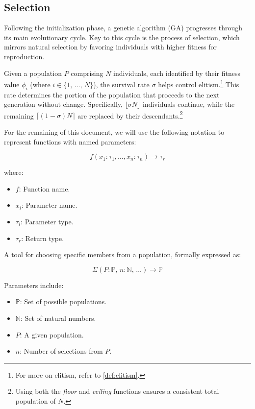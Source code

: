 \subsection{Selection}
\label{sec:bg:ga:select}
  Following the initialization phase, a genetic algorithm (GA) progresses 
  through its main evolutionary cycle.
  Key to this cycle is the process of selection, which mirrors natural selection 
  by favoring individuals with higher fitness for reproduction.

  Given a population \(P\) comprising \(N\) individuals, each identified by 
  their fitness value \(\phi_i\) (where \(i \in \{1,\, \dots,\, N\}\)), the 
  survival rate \(\sigma\) helps control elitism.\footnote{
    For more on elitism, refer to \vref{def:elitism}.
  } This rate determines the portion of the population that proceeds to the next generation without change.
  Specifically, \(\lfloor\sigma N\rfloor\) individuals continue, while the 
  remaining \(\lceil(1 - \sigma)N\rceil\) are replaced by their
  descendants.\footnote{
    Using both the \textit{floor} and \textit{ceiling} functions ensures a 
    consistent total population of \(N\).
  }

  For the remaining of this document, we will use the following notation to represent functions with named parameters:

  \[
    f(x_1: \tau_1, \dots, x_n: \tau_n) \to \tau_r
  \]
  
  where:

  \begin{itemize}
    \item \(f\): Function name.
    \item \(x_i\): Parameter name.
    \item \(\tau_i\): Parameter type.
    \item \(\tau_r\): Return type.
  \end{itemize}
  
  \begin{definition}
  \label{def:selection_operator}
    A tool for choosing specific members from a population, formally expressed as:

    \[
      \Sigma(P: \mathbb{P},\, n: \mathbb{N},\, \dots) \to \mathbb{P}
    \]

    Parameters include:
    
    \begin{itemize}
      \item \(\mathbb{P}\): Set of possible populations.
      \item \(\mathbb{N}\): Set of natural numbers.
      \item \(P\): A given population.
      \item \(n\): Number of selections from \(P\).
    \end{itemize}
  \end{definition}

